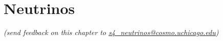  
\chapter{Neutrinos}


\def\beq{\begin{equation}}
\def\eeq{\end{equation}}

\def\bea{\begin{eqnarray}}
\def\eea{\end{eqnarray}}

\def\Neff{N_{\rm eff}}
\def\Nf{N_{\rm eff}}
\def\gs{g_{\star}}
\def\Mpl{M_{\rm pl}}
\newcommand{\nucl}[3]{ \ensuremath{ \phantom{\ensuremath{^{#1}_{#2}}} \llap{\ensuremath{^{#1}}} \llap{\ensuremath{_{\rule{0pt}{.75em}#2}}} \mbox{#3} } }


\def\gtrsim{\raise-.75ex\hbox{$\buildrel>\over\sim$}}
\def\lsim{\raise-.75ex\hbox{$\buildrel<\over\sim$}}

\begin{center}
{\small \it (send feedback on this chapter to \href{mailto:s4_neutrinos@cosmo.uchicago.edu}{s4\_neutrinos@cosmo.uchicago.edu})}
\end{center}

